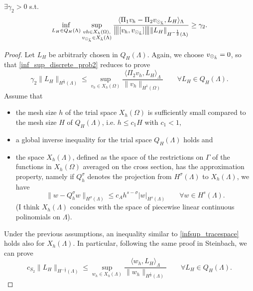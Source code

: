 \begin{theorem}
$\exists \gamma _2 >0$ s.t.
\begin{equation}\label{inf_sup_discrete_prob2}
\inf_{L_H \in Q_H(\Lambda)} 
\sup_{\substack{vh \in X_h(\Omega),\\ \vdh \in X_{\tilde{h}}(\Lambda)} }\frac{\langle \Pi_1 v_h - \Pi_2 \vdh, L_H \rangle _{\Lambda} } {\vertiii{[v_h, \vdh]} \|L_H\|_{H^{-\frac 12 }(\Lambda)}  } 
\geq \gamma _2. 
\end{equation}
\end{theorem}
\begin{proof}
Let $L_H$ be arbitrarly chosen in $Q_H(\Lambda)$. Again, we choose $v_{\odot_{\tilde{h}}} =0$, so that \eqref{inf_sup_discrete_prob2} reduces to prove
\begin{equation*}
\gamma _2 \|L_H\|_{H^{\frac 12}(\Lambda)}
\leq 
\sup_{v_h \in X_h(\Omega)} \frac{ \langle \Pi_2 v_h , L_H \rangle _{\Lambda} } {\|v_h\|_{H^1(\Omega)} } \qquad \forall L_H \in Q_H(\Lambda).
\end{equation*}
Assume that
\begin{itemize}
\item the mesh size $h$ of the trial space $X_h(\Omega)$ is sufficiently small compared to the mesh size $H$ of $Q_H(\Lambda)$, i.e. $h \leq c_1 H$ with $c_1 < 1$,
\item a global inverse inequality for the trial space $Q_H(\Lambda)$ holds and
\item the space $X_h(\Lambda)$, defined as the space of the restrictions on $\Gamma$ of the functions in $X_h(\Omega)$ averaged on the cross section, has the approximation property, namely if $Q_h^{\sigma}$ denotes the projection from $H^\sigma (\Lambda)$ to $X_h(\Lambda)$, we have
\begin{equation*}
\|w-Q_h^{\sigma} w\|_{H^{\sigma} (\Lambda)} \leq c_A h^{s-\sigma} |w|_{H^s(\Lambda)} \qquad \forall w \in H^s(\Lambda).
\end{equation*}
(I think $X_h(\Lambda)$ concides with the space of piecewise linear continuous polinomials on $\Lambda$).
\end{itemize}
Under the previous assumptions, an inequality similar to \eqref{infsup_tracespace} holds also for $X_h(\Lambda)$. In particular, following the same proof in Steinbach, we can prove 
\begin{equation}
c_{S_2} \|L_H\|_{H^{-\frac 12}(\Lambda)} \leq 
\sup_{w_h \in X_h(\Lambda)} \frac{ \langle w_h, L_H \rangle _{\Lambda} } {\|w_h\|_{H^{\frac 12}(\Lambda)}} \qquad \forall L_H \in Q_H(\Lambda).
\end{equation}

\end{proof}
